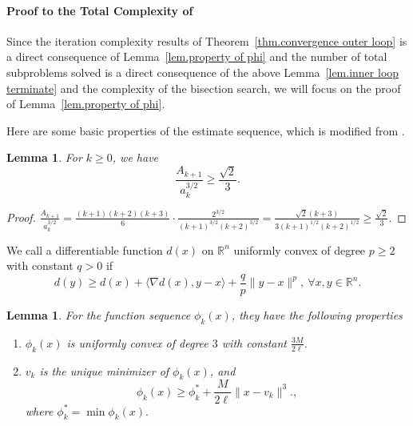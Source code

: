 \documentclass{article}
\theoremstyle{plain}
\newtheorem{lemma}[theorem]{Lemma}
\theoremstyle{definition}
\theoremstyle{remark}
\begin{document}
\paragraph{Proof to the Total Complexity of }
Since the iteration complexity results of Theorem~\ref{thm.convergence outer loop} is a direct consequence of Lemma~\ref{lem.property of phi} and the number of total subproblems solved is a direct consequence of the above Lemma~\ref{lem.inner loop terminate} and the complexity of the bisection search, we will focus on the proof of Lemma~\ref{lem.property of phi}.

Here are some basic properties of the estimate sequence, which is modified from \citet{nesterov_lectures_2018}.
\begin{lemma}
    \label{lem.magnitude a and A}
    For $k\geq 0$, we have
    \begin{equation}
        \label{eq.magnitude a and A}
        \frac{A_{k+1}}{a_k^{3/2}} \geq \frac{\sqrt{2}}{3}.
    \end{equation}
\end{lemma}
\begin{proof}
    $\frac{A_{k+1}}{a_k^{3/2}}= \frac{(k+1)(k+2)(k+3)}{6}\cdot \frac{2^{3/2}}{(k+1)^{3/2}(k+2)^{3/2}} = \frac{\sqrt{2}(k+3)}{3(k+1)^{1/2}(k+2)^{1/2}} \geq \frac{\sqrt{2}}{3}.$
\end{proof}
We call a differentiable function $d(x)$ on $\mathbb{R}^n$ uniformly convex \citet[Section 4.2.2]{nesterov_lectures_2018} of degree $p\geq 2$ with constant $q>0$ if
\begin{equation}
    \label{eq.uniformly convex of p}
    d(y)\geq d(x)+\langle \nabla d(x),y-x\rangle +\frac{q}{p}\|y-x\|^p, \ \forall x,y\in\mathbb{R}^n.
\end{equation}
\begin{lemma}
    \label{lem.property of phi appendix}
    For the function sequence $\phi_k(x)$, they have the following properties
    \begin{enumerate}
        \item $\phi_k(x)$ is uniformly convex of degree $3$ with constant $\frac{3M}{2\ell}$.
        \item $v_k$ is the unique minimizer of $\phi_k(x)$, and
              \begin{equation}
                  \label{eq.phi_k phi_low}
                  \phi_k(x)\geq \phi_k^* + \frac{M}{2\ell}\|x-v_k\|^3.,
              \end{equation}
              where $\phi_k^* =\min \phi_k(x).$
    \end{enumerate}
\end{lemma}
\end{document}

